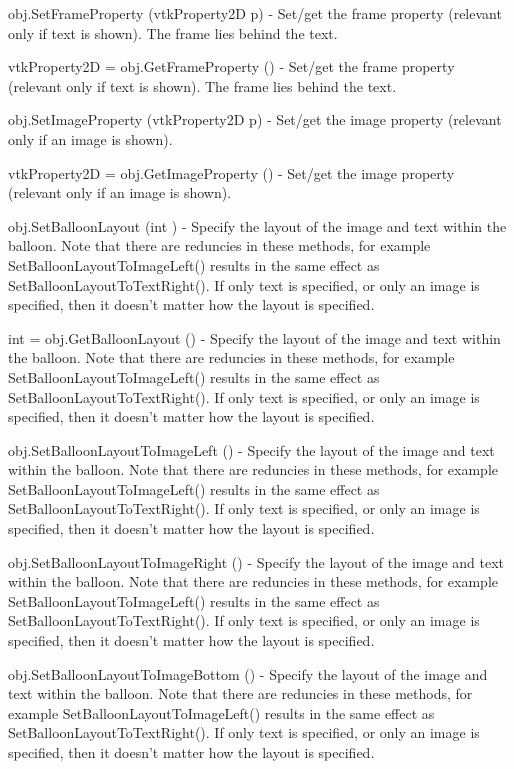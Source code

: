 \begin{DoxyItemize}
\item {\ttfamily obj.\-Set\-Frame\-Property (vtk\-Property2\-D p)} -\/ Set/get the frame property (relevant only if text is shown). The frame lies behind the text.  
\item {\ttfamily vtk\-Property2\-D = obj.\-Get\-Frame\-Property ()} -\/ Set/get the frame property (relevant only if text is shown). The frame lies behind the text.  
\item {\ttfamily obj.\-Set\-Image\-Property (vtk\-Property2\-D p)} -\/ Set/get the image property (relevant only if an image is shown).  
\item {\ttfamily vtk\-Property2\-D = obj.\-Get\-Image\-Property ()} -\/ Set/get the image property (relevant only if an image is shown).  
\item {\ttfamily obj.\-Set\-Balloon\-Layout (int )} -\/ Specify the layout of the image and text within the balloon. Note that there are reduncies in these methods, for example Set\-Balloon\-Layout\-To\-Image\-Left() results in the same effect as Set\-Balloon\-Layout\-To\-Text\-Right(). If only text is specified, or only an image is specified, then it doesn't matter how the layout is specified.  
\item {\ttfamily int = obj.\-Get\-Balloon\-Layout ()} -\/ Specify the layout of the image and text within the balloon. Note that there are reduncies in these methods, for example Set\-Balloon\-Layout\-To\-Image\-Left() results in the same effect as Set\-Balloon\-Layout\-To\-Text\-Right(). If only text is specified, or only an image is specified, then it doesn't matter how the layout is specified.  
\item {\ttfamily obj.\-Set\-Balloon\-Layout\-To\-Image\-Left ()} -\/ Specify the layout of the image and text within the balloon. Note that there are reduncies in these methods, for example Set\-Balloon\-Layout\-To\-Image\-Left() results in the same effect as Set\-Balloon\-Layout\-To\-Text\-Right(). If only text is specified, or only an image is specified, then it doesn't matter how the layout is specified.  
\item {\ttfamily obj.\-Set\-Balloon\-Layout\-To\-Image\-Right ()} -\/ Specify the layout of the image and text within the balloon. Note that there are reduncies in these methods, for example Set\-Balloon\-Layout\-To\-Image\-Left() results in the same effect as Set\-Balloon\-Layout\-To\-Text\-Right(). If only text is specified, or only an image is specified, then it doesn't matter how the layout is specified.  
\item {\ttfamily obj.\-Set\-Balloon\-Layout\-To\-Image\-Bottom ()} -\/ Specify the layout of the image and text within the balloon. Note that there are reduncies in these methods, for example Set\-Balloon\-Layout\-To\-Image\-Left() results in the same effect as Set\-Balloon\-Layout\-To\-Text\-Right(). If only text is specified, or only an image is specified, then it doesn't matter how the layout is specified.  

\end{DoxyItemize}
